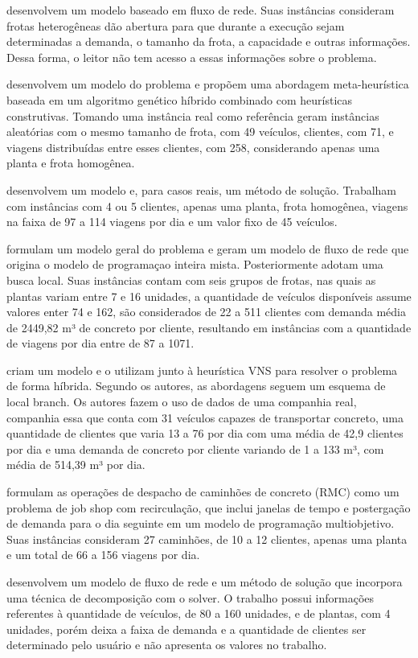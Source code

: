 \cite{tabref2} desenvolvem um modelo baseado em fluxo de rede. Suas instâncias consideram frotas heterogêneas dão abertura para que durante a execução sejam determinadas a demanda, o tamanho da frota, a capacidade e outras informações. Dessa forma, o leitor não tem acesso a essas informações sobre o problema.

\cite{tabref3} desenvolvem um modelo do problema e propõem uma abordagem meta-heu\-rís\-ti\-ca baseada em um algoritmo genético híbrido combinado com heurísticas construtivas. Tomando uma instância real como referência geram instâncias aleatórias com o mesmo tamanho de frota, com 49 veículos, clientes, com 71, e viagens distribuídas entre esses clientes, com 258, considerando apenas uma planta e frota homogênea.

\cite{tabref4} desenvolvem um modelo e, para casos reais, um método de solução. Trabalham com instâncias com 4 ou 5 clientes, apenas uma planta, frota homogênea, viagens na faixa de 97 a 114 viagens por dia e um valor fixo de 45 veículos. 

\cite{tabref5} formulam um modelo geral do problema e geram um modelo de fluxo de rede que origina o modelo de programaçao inteira mista. Posteriormente adotam uma busca local. Suas instâncias contam com seis grupos de frotas, nas quais as plantas variam entre 7 e 16 unidades, a quantidade de veículos  disponíveis assume valores enter 74 e 162, são considerados de 22 a 511 clientes com demanda média de 2449,82 m³ de concreto por cliente, resultando em instâncias com a quantidade de viagens por dia entre de 87 a 1071. 

\cite{tabref6} criam um modelo e o utilizam junto à heurística VNS para resolver o problema de forma híbrida. Segundo os autores, as abordagens seguem um esquema de local branch. Os autores fazem o uso de dados de uma companhia real, companhia essa que conta com 31 veículos capazes de transportar concreto, uma quantidade de clientes que varia 13 a 76 por dia com uma média de 42,9 clientes por dia e uma demanda de concreto por cliente variando de 1 a 133 m³, com média de 514,39 m³ por dia. 

\cite{tabref7} formulam as operações de despacho de caminhões de concreto (RMC) como um problema de job shop com recirculação, que inclui janelas de tempo e postergação de demanda para o dia seguinte em um modelo de programação multiobjetivo. Suas instâncias consideram 27 caminhões, de 10 a 12 clientes, apenas uma planta e um total de 66 a 156 viagens por dia.

\cite{tabref8} desenvolvem um modelo de fluxo de rede e um método de solução que incorpora uma técnica de decomposição com o solver. O trabalho possui informações referentes à quantidade de veículos, de 80 a 160 unidades, e de plantas, com 4 unidades, porém deixa a faixa de demanda e a quantidade de clientes ser determinado pelo usuário e não apresenta os valores no trabalho.


